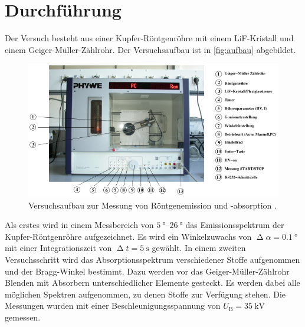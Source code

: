 \section{Durchführung}
\label{sec:Durchführung}
Der Versuch besteht aus einer Kupfer-Röntgenröhre mit einem LiF-Kristall und einem Geiger-Müller-Zählrohr.
Der Versuchsaufbau ist in \autoref{fig:aufbau} abgebildet.
\begin{figure}[H]
    \centering
    \includegraphics[width = 0.7 \textwidth]{data/aufbau.png}
    \caption{Versuchsaufbau zur Messung von Röntgenemission und -absorption \cite{Anleitung602}.}
    \label{fig:aufbau}
\end{figure}
Als erstes wird in einem Messbereich von $\SIrange{5}{26}{\degree}$ das Emissionsspektrum der Kupfer-Röntgenröhre aufgezeichnet. Es wird ein Winkelzuwachs von 
$\upDelta \alpha = \SI{0,1}{\degree}$ mit einer Integrationszeit von $\upDelta t=\SI{5}{\second}$ gewählt. \newline
In einem zweiten Versuchsschritt wird das Absorptionsspektrum verschiedener Stoffe aufgenommen und der Bragg-Winkel bestimmt.
Dazu werden vor das Geiger-Müller-Zählrohr Blenden mit Absorbern unterschiedlicher Elemente gesteckt. Es werden dabei alle möglichen Spektren aufgenommen, zu denen Stoffe zur Verfügung stehen.
Die Messungen wurden mit einer Beschleunigungsspannung von $U_{\text{B}} = \SI{35}{\kilo\volt}$ gemessen.